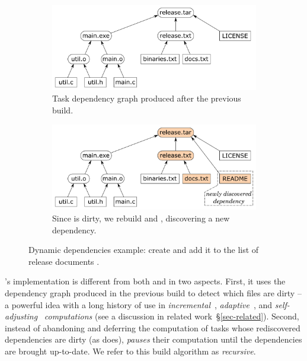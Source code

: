 \begin{figure}[h]
\begin{subfigure}[b]{0.90\linewidth}
\centerline{\includegraphics[scale=0.28]{fig/shake-example.pdf}}
\vspace{-1mm}
\caption{Task dependency graph produced after the previous build.}
\vspace{3mm}
\end{subfigure}
\begin{subfigure}[b]{0.90\linewidth}
\centerline{\includegraphics[scale=0.28]{fig/shake-example-rebuild.pdf}}
\vspace{-1mm}
\caption{Since  is dirty, we rebuild  and
, discovering a new dependency.}
\end{subfigure}
\caption{Dynamic dependencies example: create  and add it to the
list of release documents .\label{fig-shake}}
\end{figure}

\Shake's implementation is different from both \Make and \Excel in two aspects.
First, it uses the dependency graph produced in the previous build to detect
which files are dirty -- a powerful idea with a long history of use in
\emph{incremental}~\cite{demers1981incremental},
\emph{adaptive}~\cite{acar2002adaptive}, and
\emph{self-adjusting}~\cite{acar2007selfadjusting} \emph{computations} (see a
discussion in related work~\S\ref{sec-related}). Second, instead of abandoning
and deferring the computation of tasks whose rediscovered dependencies are dirty
(as \Excel does), \Shake \emph{pauses} their computation until the dependencies
are brought up-to-date. We refer to this build algorithm as \emph{recursive}.

